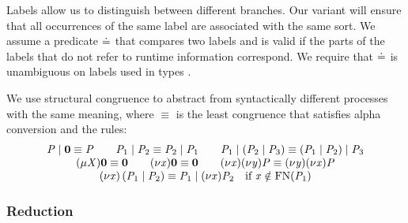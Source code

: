Labels allow us to distinguish between different branches.
Our \MPST variant will ensure that all occurrences of the same label are associated with the same sort.
We assume a predicate $ \compL[] $ that compares two labels and is valid if the parts of the labels that do not refer to runtime information correspond.
We require that $ \compL[] $ is unambiguous on labels used in types \cite{PetersEtal21}.

We use structural congruence to abstract from syntactically different processes with the same meaning, where $ \equiv $ is the least congruence that satisfies alpha conversion and the rules:
\[ \begin{array}{c}
	\PT \mid \PEnd \equiv \PT
	\hspace{2em} \PT_1 \mid \PT_2 \equiv \PT_2 \mid \PT_1
	\hspace{2em} \PT_1 \mid \left( \PT_2 \mid \PT_3 \right) \equiv \left( \PT_1 \mid \PT_2 \right) \mid \PT_3\\
	\PRep{\ProcV}{\PEnd} \equiv \PEnd
	\hspace{2em} \PRes{\Args}{\PEnd} \equiv \PEnd
	\hspace{2em} \PRes{\Args}{\PRes{\Args[y]}{\PT}} \equiv \PRes{\Args[y]}{\PRes{\Args}{\PT}}\\
	\PRes{\Args}{\left( \PT_1 \mid \PT_2 \right)} \equiv \PT_1 \mid \PRes{\Args}{\PT_2} \quad \text{if } \Args \notin \FreeNames{\PT_1}
\end{array} \]

\subsubsection{Reduction}

